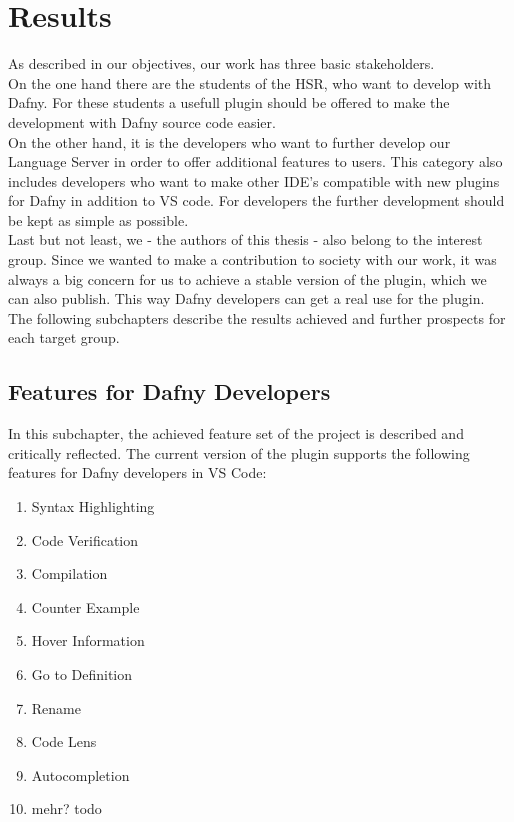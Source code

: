 \section{Results}
\label{section:results}

As described in our objectives, our work has three basic stakeholders. \\

On the one hand there are the students of the HSR, who want to develop with Dafny.
For these students a usefull plugin should be offered to make the development with Dafny source code easier. \\

On the other hand, it is the developers who want to further develop our Language Server in order to offer additional features to users.
This category also includes developers who want to make other IDE's compatible with new plugins for Dafny in addition to VS code.
For developers the further development should be kept as simple as possible. \\

Last but not least, we - the authors of this thesis - also belong to the interest group.
Since we wanted to make a contribution to society with our work,
it was always a big concern for us to achieve a stable version of the plugin, which we can also publish.
This way Dafny developers can get a real use for the plugin. \\

The following subchapters describe the results achieved and further prospects for each target group.

\subsection{Features for Dafny Developers}
In this subchapter, the achieved feature set of the project is described and critically reflected.
The current version of the plugin supports the following features for Dafny developers in VS Code:
\begin{enumerate}
    \item Syntax Highlighting
    \item Code Verification
    \item Compilation
    \item Counter Example
    \item Hover Information
    \item Go to Definition
    \item Rename
    \item Code Lens
    \item Autocompletion
    \item mehr? todo
\end{enumerate}

